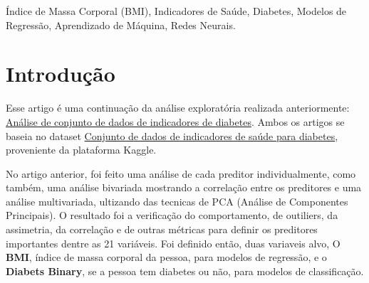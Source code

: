 \documentclass[conference]{IEEEtran}
\begin{document}
\begin{abstract}
Neste trabalho da disciplina de Inteligência Computacional Aplicada, desenvolvemos e avaliamos modelos de regressão com o objetivo de prever o Índice de Massa Corporal (BMI) de indivíduos a partir de um conjunto de dados de indicadores de saúde relacionados à diabetes. O estudo dá continuidade à análise exploratória realizada anteriormente, utilizando como base o conjunto de dados de indicadores de saúde para diabetes, disponibilizado na plataforma Kaggle.

Para isso, foram desenvolvidos diferentes modelos de regressão, incluindo Mínimos Quadrados Ordinários (OLS), regressão linear penalizada Ridge, Regressão por Componentes Principais (PCR) ou Mínimos Quadrados Parciais (PLS), além de redes neurais artificiais. Os modelos foram avaliados por meio de métricas como Raiz do Erro Quadrático Médio (RMSE), coeficiente de determinação ($R^2$) e validação cruzada utilizando K-fold, buscando comparar seus desempenhos preditivos.

Dentre os resultados obtidos, a rede neural, utilizando uma camada oculta composta por 6 neurônios, apresentou o melhor RMSE de 6,1480 e $R^2$ de 0,2353, demonstrando um desempenho ligeiramente superior dentre os outros modelos. Os resultados sugerem que a utilização de modelos não lineares pode contribuir para representar as relações entre os indicadores de saúde e o BMI, embora a capacidade explicativa dos modelos ainda seja limitada. 
\end{abstract}

\begin{IEEEkeywords}
Índice de Massa Corporal (BMI), Indicadores de Saúde, Diabetes, Modelos de Regressão, Aprendizado de Máquina, Redes Neurais.
\end{IEEEkeywords}

\section{Introdução}
Esse artigo é uma continuação da análise exploratória realizada anteriormente: \href{run:arquivos/HW1.pdf}{Análise de conjunto de dados de indicadores de diabetes}.
Ambos os artigos se baseia no dataset 
\href{https://www.kaggle.com/datasets/alexteboul/diabetes-health-indicators-dataset/data?select=diabetes_binary_5050split_health_indicators_BRFSS2015.csv}{Conjunto de dados de indicadores de saúde para diabetes},
proveniente da plataforma Kaggle.


No artigo anterior, foi feito uma análise de cada preditor individualmente, como também, uma análise bivariada mostrando a correlação entre os preditores e uma análise multivariada, ultizando das tecnicas de PCA (Análise de Componentes Principais). O resultado foi a verificação do comportamento, de outiliers, da assimetria, da correlação e de outras métricas para definir os preditores importantes dentre as 21 variáveis. Foi definido então, duas variaveis alvo, O \textbf{BMI}, índice de massa corporal da pessoa, para modelos de regressão, e o \textbf{Diabets Binary}, se a pessoa tem diabetes ou não, para modelos de classificação. 
\end{document}
